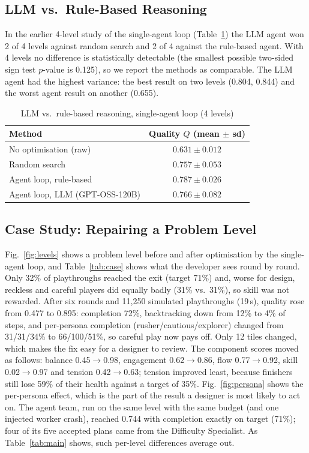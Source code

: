 \documentclass[conference]{IEEEtran}
\begin{document}
\subsection{LLM vs.\ Rule-Based Reasoning}
In the earlier 4-level study of the single-agent loop (Table~\ref{tab:llm}) the LLM agent won 2 of 4 levels against random search
and 2 of 4 against the rule-based agent. With 4 levels no difference is statistically detectable
(the smallest possible two-sided sign test $p$-value is 0.125), so we report the methods as
comparable. The LLM agent had the highest variance: the best result on two levels (0.804, 0.844)
and the worst agent result on another (0.655).

\begin{table}[t]
\caption{LLM vs.\ rule-based reasoning, single-agent loop (4 levels)}
\label{tab:llm}
\centering
\footnotesize
\begin{tabular}{@{}lc@{}}
\toprule
Method & Quality $Q$ (mean $\pm$ sd) \\
\midrule
No optimisation (raw) & $0.631 \pm 0.012$ \\
Random search & $0.757 \pm 0.053$ \\
Agent loop, rule-based & $\mathbf{0.787 \pm 0.026}$ \\
Agent loop, LLM (GPT-OSS-120B) & $0.766 \pm 0.082$ \\
\bottomrule
\end{tabular}
\end{table}

\subsection{Case Study: Repairing a Problem Level}
\label{sec:case}
Fig.~\ref{fig:levels} shows a problem level before and after optimisation by the single-agent loop, and Table~\ref{tab:case}
shows what the developer sees round by round. Only 32\% of playthroughs reached the exit (target
71\%) and, worse for design, reckless and careful players did equally badly (31\% vs.\ 31\%), so
skill was not rewarded. After six rounds and 11,250 simulated playthroughs (19\,s),
quality rose from 0.477 to 0.895: completion 72\%, backtracking down from 12\% to 4\% of steps, and
per-persona completion (rusher/cautious/explorer) changed from 31/31/34\% to 66/100/51\%, so careful
play now pays off. Only 12 tiles changed, which makes the fix easy for a designer to review. The
component scores moved as follows: balance 0.45$\to$0.98, engagement 0.62$\to$0.86, flow
0.77$\to$0.92, skill 0.02$\to$0.97 and tension 0.42$\to$0.63; tension improved least, because
finishers still lose 59\% of their health against a target of 35\%. Fig.~\ref{fig:persona}
shows the per-persona effect, which is the part of the result a designer is most likely to act on.
The agent team, run on the same level with the same budget (and one injected worker crash),
reached 0.744 with completion exactly on target (71\%); four of its five accepted plans came from the
Difficulty Specialist. As Table~\ref{tab:main} shows, such per-level differences average out.
\end{document}
